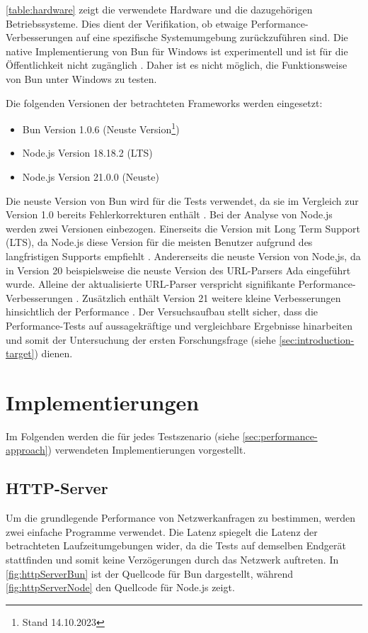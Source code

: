 \noindent
\autoref{table:hardware} zeigt die verwendete Hardware und die dazugehörigen Betriebssysteme. Dies dient der Verifikation, ob etwaige Performance-Verbesserungen auf eine spezifische Systemumgebung zurückzuführen sind. Die native Implementierung von Bun für Windows ist experimentell und ist für die Öffentlichkeit nicht zugänglich \cite{Verhelst.2023}. Daher ist es nicht möglich, die Funktionsweise von Bun unter Windows zu testen.

\noindent
Die folgenden Versionen der betrachteten Frameworks werden eingesetzt:
\begin{itemize}
	\item Bun Version 1.0.6 (Neuste Version\footnote{Stand 14.10.2023\label{footnote:Stand}})
	\item Node.js Version 18.18.2 (LTS)
	\item Node.js Version 21.0.0 (Neuste)
\end{itemize}

\noindent
Die neuste Version von Bun wird für die Tests verwendet, da sie im Vergleich zur Version 1.0 bereits Fehlerkorrekturen enthält \cite{Sumner.2023b}. Bei der Analyse von Node.js werden zwei Versionen einbezogen. Einerseits die Version mit Long Term Support (LTS), da Node.js diese Version für die meisten Benutzer aufgrund des langfristigen Supports empfiehlt \cite{OpenJSFoundation.o.J.}. Andererseits die neuste Version von Node,js, da in Version 20 beispielsweise die neuste Version des URL-Parsers Ada eingeführt wurde. Alleine der aktualisierte URL-Parser verspricht signifikante Performance-Verbesserungen \cite{OpenJSFoundation.2023}. Zusätzlich enthält Version 21 weitere kleine Verbesserungen hinsichtlich der Performance \cite{OpenJSFoundation.2023b}. \newline
Der Versuchsaufbau stellt sicher, dass die Performance-Tests auf aussagekräftige und vergleichbare Ergebnisse hinarbeiten und somit der Untersuchung der ersten Forschungsfrage (siehe \autoref{sec:introduction-target}) dienen.

\section{Implementierungen} \label{sec:performance-implementations}
Im Folgenden werden die für jedes Testszenario (siehe \autoref{sec:performance-approach}) verwendeten Implementierungen vorgestellt.

\subsection{HTTP-Server} \label{subsec:httpServer}
Um die grundlegende Performance von Netzwerkanfragen zu bestimmen, werden zwei einfache Programme verwendet. Die Latenz spiegelt die Latenz der betrachteten Laufzeitumgebungen wider, da die Tests auf demselben Endgerät stattfinden und somit keine Verzögerungen durch das Netzwerk auftreten. In \autoref{fig:httpServerBun} ist der Quellcode für Bun dargestellt, während \autoref{fig:httpServerNode} den Quellcode für Node.js zeigt.

